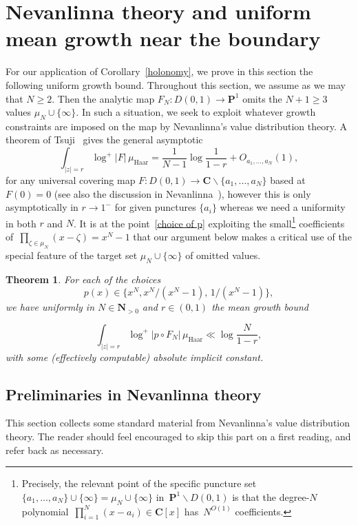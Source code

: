 \documentclass[10pt]{amsart}
\def\NwithoutzeroA{\mathbf{N}_{> 0}}
\renewcommand\setminus{\smallsetminus}
\renewcommand\mathbb{\mathbf}
\newtheorem{thm}[subsubsection]{Theorem}
\theoremstyle{remark}
\numberwithin{equation}{subsection}
\def\numequation{\addtocounter{subsubsection}{1}\begin{equation}}
\def\C{\mathbf{C}}
\begin{document}
\section{Nevanlinna theory and uniform mean growth near the boundary}  \label{nevanlinna}

For our application of Corollary~\ref{holonomy}, 
we prove in this section the following uniform growth bound. Throughout this section, we assume as
we may that $N \geq 2$. Then the analytic map $F_N :D(0,1) \to \mathbb{P}^1$ omits the $N+1 \geq 3$ values $\mu_N \cup \{\infty\}$. In such a situation, we seek to exploit  whatever growth constraints are imposed on the map by Nevanlinna's value distribution theory. A theorem of Tsuji~\cite[Theorem~11]{Tsuji} gives the general asymptotic
$$
\int_{|z| = r} \log^+{|F|} \, \mu_{\mathrm{Haar}}  =  \frac{1}{N-1} \log{\frac{1}{1-r}} + O_{a_1, \ldots, a_N}(1),
$$ 
 for any universal covering map $F : D(0,1) \to \C \setminus \{a_1, \ldots, a_N\}$ based at $F(0) = 0$ (see also the discussion in Nevanlinna~\cite[page~272]{Nevanlinna}), however this is only asymptotically
in $r \to 1^-$ for given punctures $\{a_i\}$ whereas we need a uniformity in both $r$ and $N$.
It is at the point~\eqref{choice of p} exploiting the small\footnote{Precisely, the relevant point of the specific puncture set~$\{a_1,\ldots, a_N\} \cup \{\infty\} = \mu_N \cup \{\infty\}$ in~$\mathbb{P}^1 \setminus D(0,1)$ is that the degree-$N$ polynomial~$\prod_{i=1}^{N} (x-a_i) \in \C[x]$ has~$N^{O(1)}$ coefficients.} coefficients of~$\prod_{\zeta \in \mu_N} (x-\zeta) = x^N -1$
that 
our argument below makes a critical use of the special feature of the target set $\mu_N \cup \{\infty\}$ of omitted values.

\begin{thm}  \label{growth term}
For each of the choices
$$
p(x) \in \big\{ x^N,  x^N / (x^N - 1), \, 1/(x^N-1) \big\}, 
$$
we have uniformly in $N \in \NwithoutzeroA$ and $r \in (0,1)$ the mean growth bound
\numequation \label{mean proximity bound}
\int_{|z| = r} \log^+|p \circ F_N| \, \mu_{\mathrm{Haar}} \ll \log{\frac{N}{1-r}}, 
\end{equation}
with some (effectively computable) absolute  implicit constant. 
\end{thm}

\subsection{Preliminaries in Nevanlinna theory} This section collects some standard material from Nevanlinna's value distribution theory. The reader should feel encouraged  to skip this part on a first reading, and refer back as necessary. 
\end{document}
